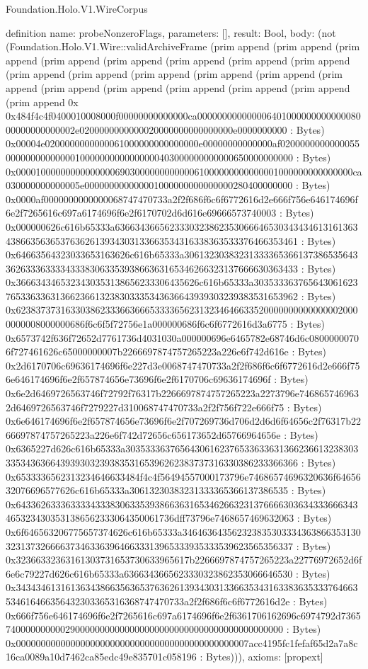 \begin{lexlean}{Foundation.Holo.V1.WireCorpus}
\begin{semanticmodule}
definition{
  name: probeNonzeroFlags,
  parameters: [],
  result: Bool,
  body: (not (Foundation.Holo.V1.Wire::validArchiveFrame (prim append (prim append (prim append (prim append (prim append (prim append (prim append (prim append (prim append (prim append (prim append (prim append (prim append (prim append (prim append (prim append (prim append (prim append (prim append (prim append 0x 0x484f4c4f0400010008000f00000000000000ca00000000000000640100000000000008000000000000002e0200000000000020000000000000000e0000000000 : Bytes) 0x00004e0200000000000061000000000000000e00000000000000af02000000000000550000000000000010000000000000000403000000000000650000000000 : Bytes) 0x00001000000000000000690300000000000061000000000000001000000000000000ca030000000000005e000000000000001000000000000000280400000000 : Bytes) 0x0000af0000000000000068747470733a2f2f686f6c6f6772616d2e666f756e646174696f6e2f7265616c697a6174696f6e2f6170702d6d616e69666573740003 : Bytes) 0x000000626c616b65333a636634366562333032386235306664653034343461316136343866356365376362613934303133663534316338363533376466353461 : Bytes) 0x64663564323033653163626c616b65333a3061323038323133336536613738653564336263336333343338306335393866363165346266323137666630363433 : Bytes) 0x3666343465323430353138656233306435626c616b65333a30353336376564306162376533633631366236613238303335343636643939303239383531653962 : Bytes) 0x6238373731633038623336636665333365623132346466335200000000000000020000000008000000686f6c6f5f72756e1a000000686f6c6f6772616d3a6775 : Bytes) 0x6573742f636f72652d7761736d4031030a000000696e6465782e68746d6c08000000706f727461626c65000000007b2266697874757265223a226e6f742d616e : Bytes) 0x2d6170706c69636174696f6e227d3e0068747470733a2f2f686f6c6f6772616d2e666f756e646174696f6e2f657874656e73696f6e2f6170706c69636174696f : Bytes) 0x6e2d6469726563746f72792f76317b2266697874757265223a2273796e7468657469632d6469726563746f7279227d310068747470733a2f2f756f722e666f75 : Bytes) 0x6e646174696f6e2f657874656e73696f6e2f707269736d706d2d6d6f64656c2f76317b2266697874757265223a226e6f742d72656c656173652d65766964656e : Bytes) 0x6365227d626c616b65333a3035333637656430616237653363363136623661323830333534363664393930323938353165396262383737316330386233366366 : Bytes) 0x6533336562313234646633484f4c4f56494557000173796e74686574696320636f6465632076696577626c616b65333a30613230383231333365366137386535 : Bytes) 0x6433626333633334333830633539386636316534626632313766663036343336663434653234303531386562333064350061736dff73796e7468657469632063 : Bytes) 0x6f646563206775657374626c616b65333a3464636435623238353033343638663531303231373266663734633639646633313965333935333539623565356337 : Bytes) 0x32366332363161303731653730633965617b2266697874757265223a22776972652d6f6e6c79227d626c616b65333a6366343665623330323862353066646530 : Bytes) 0x343434613161363438663563653763626139343031336635343163383635333764663534616466356432303365316368747470733a2f2f686f6c6f6772616d2e : Bytes) 0x666f756e646174696f6e2f7265616c697a6174696f6e2f6361706162696c6974792d736574000000000029000000000000000000000000000000000000000000 : Bytes) 0x00000000000000000000000000000000000000000000007acc4195fc1fefaf65d2a7a8c16ca0089a10d7462ca85edc49e835701c058196 : Bytes))),
  axioms: [propext]
}


\end{semanticmodule}
\end{lexlean}
